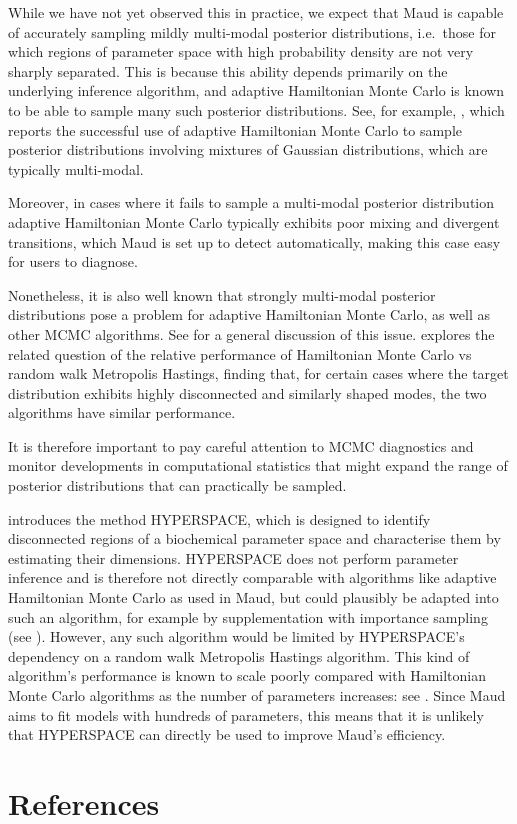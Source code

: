 \documentclass[journal=asbcd6,manuscript=article,layout=traditional]{achemso}
\begin{document}
While we have not yet observed this in practice, we expect that Maud is
capable of accurately sampling mildly multi-modal posterior
distributions, i.e.~those for which regions of parameter space with high
probability density are not very sharply separated. This is because this
ability depends primarily on the underlying inference algorithm, and
adaptive Hamiltonian Monte Carlo is known to be able to sample many such
posterior distributions. See, for example,
\citet{mangiolaSccompRobustDifferential2023}, which reports the
successful use of adaptive Hamiltonian Monte Carlo to sample posterior
distributions involving mixtures of Gaussian distributions, which are
typically multi-modal.

Moreover, in cases where it fails to sample a multi-modal posterior
distribution adaptive Hamiltonian Monte Carlo typically exhibits poor
mixing and divergent transitions, which Maud is set up to detect
automatically, making this case easy for users to diagnose.

Nonetheless, it is also well known that strongly multi-modal posterior
distributions pose a problem for adaptive Hamiltonian Monte Carlo, as
well as other MCMC algorithms. See
\citep[§3.2]{betancourtmichaelMarkovChainMonte2020} for a general
discussion of this issue. \citet{mangoubiDoesHamiltonianMonte2018}
explores the related question of the relative performance of Hamiltonian
Monte Carlo vs random walk Metropolis Hastings, finding that, for
certain cases where the target distribution exhibits highly disconnected
and similarly shaped modes, the two algorithms have similar performance.

It is therefore important to pay careful attention to MCMC diagnostics
and monitor developments in computational statistics that might expand
the range of posterior distributions that can practically be sampled.

\citet{zamora-silleroEfficientCharacterizationHighdimensional2011}
introduces the method HYPERSPACE, which is designed to identify
disconnected regions of a biochemical parameter space and characterise
them by estimating their dimensions. HYPERSPACE does not perform
parameter inference and is therefore not directly comparable with
algorithms like adaptive Hamiltonian Monte Carlo as used in Maud, but
could plausibly be adapted into such an algorithm, for example by
supplementation with importance sampling (see
\citet{vehtariParetoSmoothedImportance2022}). However, any such
algorithm would be limited by HYPERSPACE's dependency on a random walk
Metropolis Hastings algorithm. This kind of algorithm's performance is
known to scale poorly compared with Hamiltonian Monte Carlo algorithms
as the number of parameters increases: see
\citet{mangoubiDoesHamiltonianMonte2018}. Since Maud aims to fit models
with hundreds of parameters, this means that it is unlikely that
HYPERSPACE can directly be used to improve Maud's efficiency.

\hypertarget{references}{%
\section{References}\label{references}}

\renewcommand{\bibsection}{}

\end{document}
